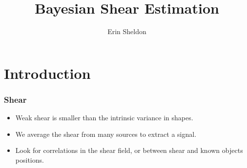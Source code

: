 \documentclass{beamer}
\title{Bayesian Shear Estimation}
\author{Erin Sheldon}
\institute{Brookhaven National Laboratory}
\begin{document}
\frame{\titlepage}

\section{Introduction}

\frame
{
    \frametitle{Shear}

    \begin{itemize}

        \item Weak shear is smaller than the intrinsic variance in shapes.
            
        \item We average the shear from many sources to extract a signal.

        \item Look for correlations in the shear field, or between shear and
            known objects positions.


    \end{itemize}
}
\frame
\end{document}
